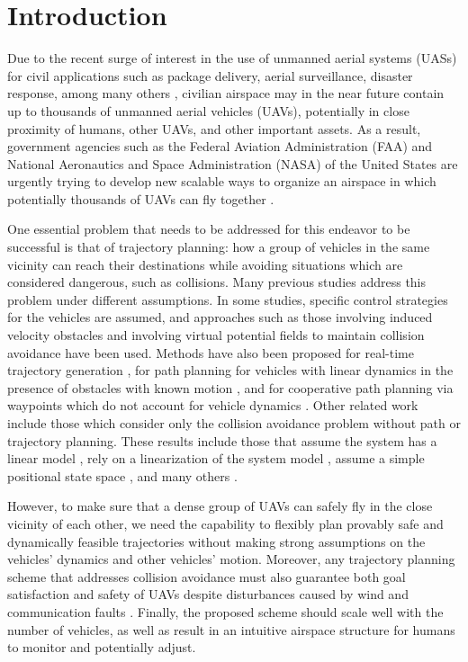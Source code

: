\section{Introduction \label{sec:introduction}}
Due to the recent surge of interest in the use of unmanned aerial systems (UASs) for civil applications such as package delivery, aerial surveillance, disaster response, among many others \cite{Tice91, Debusk10, Amazon16, AUVSI16, BBC16}, civilian airspace may in the near future contain up to thousands of unmanned aerial vehicles (UAVs), potentially in close proximity of humans, other UAVs, and other important assets. As a result, government agencies such as the Federal Aviation Administration (FAA) and National Aeronautics and Space Administration (NASA) of the United States are urgently trying to develop new scalable ways to organize an airspace in which potentially thousands of UAVs can fly together \cite{FAA13, Kopardekar16}.

One essential problem that needs to be addressed for this endeavor to be successful is that of trajectory planning: how a group of vehicles in the same vicinity can reach their destinations while avoiding situations which are considered dangerous, such as collisions. Many previous studies address this problem under different assumptions. In some studies, specific control strategies for the vehicles are assumed, and approaches such as those involving induced velocity obstacles \cite{Fiorini98, Chasparis05, Vandenberg08,Wu2012} and involving virtual potential fields to maintain collision avoidance \cite{Olfati-Saber2002, Chuang07} have been used. Methods have also been proposed for real-time trajectory generation \cite{Feng-LiLian2002}, for path planning for vehicles with linear dynamics in the presence of obstacles with known motion \cite{Ahmadzadeh2009}, and for cooperative path planning via waypoints which do not account for vehicle dynamics \cite{Bellingham}. Other related work include those which consider only the collision avoidance problem without path or trajectory planning. These results include those that assume the system has a linear model \cite{Beard2003, Schouwenaars2004, Stipanovic2007}, rely on a linearization of the system model \cite{Massink2001, Althoff2011}, assume a simple positional state space \cite{Lin2015}, and many others \cite{Lalish2008, Hoffmann2008, Chen2016}.

However, to make sure that a dense group of UAVs can safely fly in the close vicinity of each other, we need the capability to flexibly plan provably safe and dynamically feasible trajectories without making strong assumptions on the vehicles' dynamics and other vehicles' motion. Moreover, any trajectory planning scheme that addresses collision avoidance must also guarantee both goal satisfaction and safety of UAVs despite disturbances caused by wind and communication faults \cite{Kopardekar16}. Finally, the proposed scheme should scale well with the number of vehicles, as well as result in an intuitive airspace structure for humans to monitor and potentially adjust.

